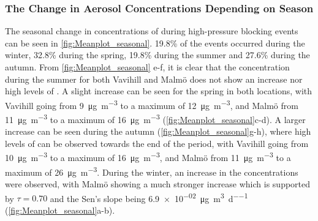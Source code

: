 \subsubsection{The Change in Aerosol Concentrations Depending on Season}
The seasonal change in concentrations of \PM during high-pressure blocking events can be seen in \autoref{fig:Meanplot_seasonal}. 19.8\% of the events occurred during the winter, 32.8\% during the spring, 19.8\% during the summer and 27.6\% during the autumn. From \autoref{fig:Meanplot_seasonal} e-f, it is clear that the concentration during the summer for both Vavihill and Malmö does not show an increase nor high levels of \PM. A slight increase can be seen for the spring in both locations, with Vavihill going from \SI{9}{\micro\gram\per\meter\cubed} to a maximum of \SI{12}{\micro\gram\per\meter\cubed}, and Malmö from \SI{11}{\micro\gram\per\meter\cubed} to a maximum of \SI{16}{\micro\gram\per\meter\cubed} (\autoref{fig:Meanplot_seasonal}c-d). A larger increase can be seen during the autumn (\autoref{fig:Meanplot_seasonal}g-h), where high levels of \PM can be observed towards the end of the period, with Vavihill going from \SI{10}{\micro\gram\per\meter\cubed} to a maximum of \SI{16}{\micro\gram\per\meter\cubed}, and Malmö from \SI{11}{\micro\gram\per\meter\cubed} to a maximum of \SI{26}{\micro\gram\per\meter\cubed}. During the winter, an increase in the \PM concentrations were observed, with Malmö showing a much stronger increase which is supported by $\tau=0.70$ and the Sen's slope being \SI{6.9e-02}{\micro\gram\per\meter\cubed\per\day} (\autoref{fig:Meanplot_seasonal}a-b). 

